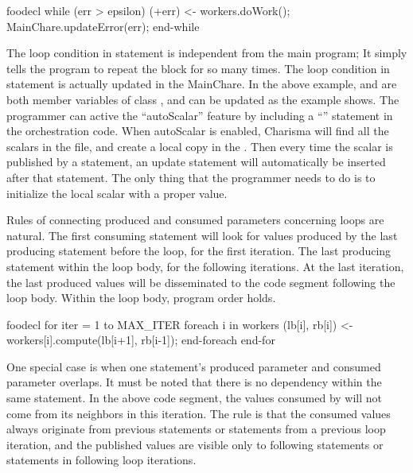 \begin{SaveVerbatim}{foodecl}
  while (err > epsilon)
     (+err) <- workers.doWork();
     MainChare.updateError(err);
  end-while
\end{SaveVerbatim}
\vspace{0.1in}
\vspace{0.1in}

The loop condition in  statement is independent from the main program;
It simply tells the program to repeat the block for so many times. The loop
condition in  statement is actually updated in the MainChare. In the
above example,  and  are both member variables of class
, and can be updated as the example shows. The programmer can
active the ``autoScalar'' feature by including a ``''
statement in the orchestration code. When autoScalar is enabled,  Charisma will
find all the scalars in the  file, and create a local copy in the
. Then every time the scalar is published by a statement, an
update statement will automatically be inserted after that statement. The only
thing that the programmer needs to do is to initialize the local scalar with
a proper value. 

Rules of connecting produced and consumed parameters concerning loops are
natural. The first consuming statement will look for values produced by the last
producing statement before the loop, for the first iteration. The last
producing statement within the loop body, for the following iterations. At the
last iteration, the last produced values will be disseminated to the code
segment following the loop body. Within the loop body, program order holds. 

\begin{SaveVerbatim}{foodecl}
  for iter = 1 to MAX_ITER
    foreach i in workers
      (lb[i], rb[i]) <- workers[i].compute(lb[i+1], rb[i-1]);
    end-foreach
  end-for
\end{SaveVerbatim}
\vspace{0.1in}
\vspace{0.1in}

One special case is when one statement's produced parameter and consumed
parameter overlaps. It must be noted that there is no dependency within the same
 statement. In the above code segment, the values consumed
 by  will not come from  
its neighbors in this iteration. The rule is that the consumed values always
originate from previous  statements or  statements
from a previous loop iteration, and the published values are visible only to
following  statements or  statements in following
loop iterations. 

